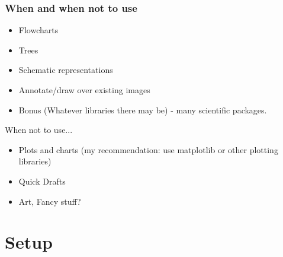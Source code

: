 \documentclass{beamer}
\begin{document}

\begin{frame}
    
\end{frame}


\begin{frame}
    \begin{figure}
        
    \end{figure}
\end{frame}


\begin{frame}
    \frametitle{When and when not to use}

    \begin{itemize}
        \item Flowcharts
        \item Trees
        \item Schematic representations
        \item Annotate/draw over existing images
        \item Bonus (Whatever libraries there may be) - many scientific packages.
     \end{itemize}

     \begin{block}{When not to use...}
     \begin{itemize}
         \item Plots and charts (my recommendation: use matplotlib or other plotting libraries)
         \item Quick Drafts
         \item Art, Fancy stuff?
     \end{itemize}
    \end{block}
\end{frame}


\section{Setup}
\end{document}
